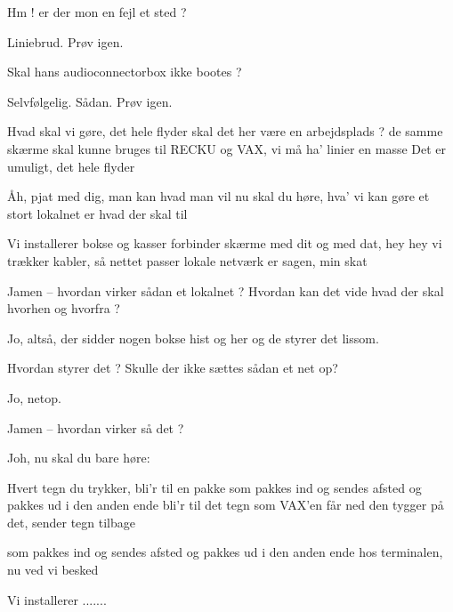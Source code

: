 \documentclass[a4paper,11pt]{article}
\begin{document}
\begin{sketch}
 Hm !  er der mon en fejl et sted ? 

 Liniebrud.  Prøv igen.


 Skal hans audioconnectorbox ikke bootes ?

 Selvfølgelig.  Sådan. Prøv igen.

\end{sketch}

\begin{song}
Hvad skal vi gøre, det hele flyder
skal det her være en arbejdsplads ?
de samme skærme skal kunne bruges
til RECKU og VAX, vi må ha' linier en masse
Det er umuligt, det hele flyder

Åh, pjat med dig, man kan hvad man vil
nu skal du høre, hva' vi kan gøre
et stort lokalnet er hvad der skal til

Vi installerer bokse og kasser
forbinder skærme med dit og med dat, hey hey
vi trækker kabler, så nettet passer
lokale netværk er sagen, min skat
\end{song}

\begin{sketch}
 Jamen -- hvordan virker sådan et lokalnet ? Hvordan kan det vide hvad
der skal hvorhen og hvorfra ?

 Jo, altså, der sidder nogen bokse hist og her og de styrer det lissom.

 Hvordan styrer det ? Skulle der ikke sættes sådan et net op?

 Jo, netop.

 Jamen -- hvordan virker så det ?

 Joh, nu skal du bare høre: 
\end{sketch}

\begin{song}
Hvert tegn du trykker, bli'r til en pakke
som pakkes ind og sendes afsted
og pakkes ud i den anden ende
bli'r til det tegn som VAX'en får ned
den tygger på det, sender tegn tilbage

som pakkes ind og sendes afsted
og pakkes ud i den anden ende
hos terminalen, nu ved vi besked

Vi installerer .......
\end{song}
\end{document}
